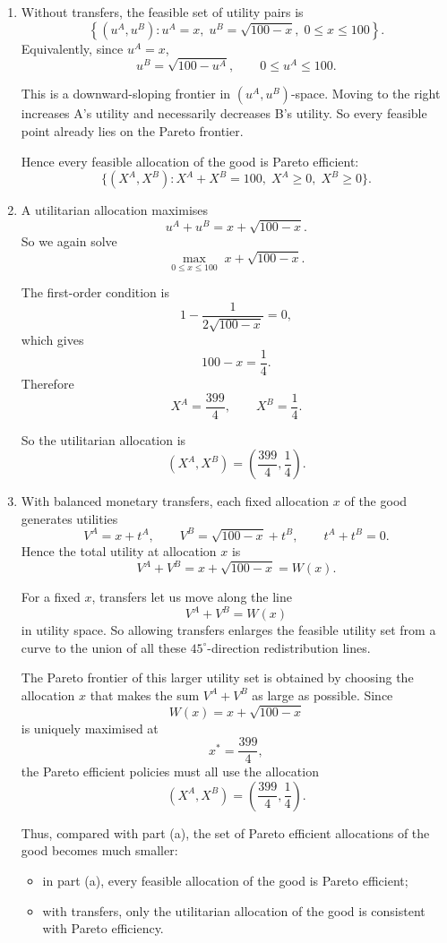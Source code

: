 \documentclass[12pt]{article}
\begin{document}
\begin{enumerate}[label=(\alph*)]
    \item
    Without transfers, the feasible set of utility pairs is
    \[
    \left\{(u^A,u^B): u^A=x,\; u^B=\sqrt{100-x},\; 0\le x\le 100\right\}.
    \]
    Equivalently, since \(u^A=x\),
    \[
    u^B=\sqrt{100-u^A},
    \qquad 0\le u^A\le 100.
    \]

    This is a downward-sloping frontier in \((u^A,u^B)\)-space. Moving to the right increases A's utility and necessarily decreases B's utility. So every feasible point already lies on the Pareto frontier.

    Hence every feasible allocation of the good is Pareto efficient:
    \[
    \boxed{\{(X^A,X^B): X^A+X^B=100,\; X^A\ge 0,\; X^B\ge 0\}.}
    \]

    \item
    A utilitarian allocation maximises
    \[
    u^A+u^B=x+\sqrt{100-x}.
    \]
    So we again solve
    \[
    \max_{0\le x\le 100}\; x+\sqrt{100-x}.
    \]

    The first-order condition is
    \[
    1-\frac{1}{2\sqrt{100-x}}=0,
    \]
    which gives
    \[
    100-x=\frac14.
    \]
    Therefore
    \[
    X^A=\frac{399}{4},
    \qquad
    X^B=\frac14.
    \]

    So the utilitarian allocation is
    \[
    \boxed{\left(X^A,X^B\right)=\left(\frac{399}{4},\frac14\right).}
    \]
\newpage
    \item
    With balanced monetary transfers, each fixed allocation \(x\) of the good generates utilities
    \[
    V^A=x+t^A,
    \qquad
    V^B=\sqrt{100-x}+t^B,
    \qquad
    t^A+t^B=0.
    \]
    Hence the total utility at allocation \(x\) is
    \[
    V^A+V^B=x+\sqrt{100-x}=W(x).
    \]

    For a fixed \(x\), transfers let us move along the line
    \[
    V^A+V^B=W(x)
    \]
    in utility space. So allowing transfers enlarges the feasible utility set from a curve to the union of all these \(45^\circ\)-direction redistribution lines.

    The Pareto frontier of this larger utility set is obtained by choosing the allocation \(x\) that makes the sum \(V^A+V^B\) as large as possible. Since
    \[
    W(x)=x+\sqrt{100-x}
    \]
    is uniquely maximised at
    \[
    x^*=\frac{399}{4},
    \]
    the Pareto efficient policies must all use the allocation
    \[
    \left(X^A,X^B\right)=\left(\frac{399}{4},\frac14\right).
    \]

    Thus, compared with part (a), the set of Pareto efficient allocations of the good becomes much smaller:
    \begin{itemize}[leftmargin=*]
        \item in part (a), every feasible allocation of the good is Pareto efficient;
        \item with transfers, only the utilitarian allocation of the good is consistent with Pareto efficiency.
    \end{itemize}


\end{enumerate}
\end{document}
